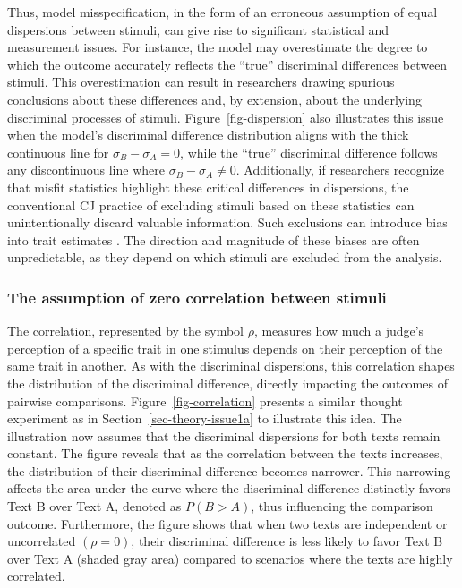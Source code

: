 \documentclass[
  authoryear,
  review,
  1p]{elsarticle}
\begin{document}
Thus, model misspecification, in the form of an erroneous assumption of
equal dispersions between stimuli, can give rise to significant
statistical and measurement issues. For instance, the model may
overestimate the degree to which the outcome accurately reflects the
``true'' discriminal differences between stimuli. This overestimation
can result in researchers drawing spurious conclusions about these
differences \citep[pp.~370]{McElreath_2020} and, by extension, about the
underlying discriminal processes of stimuli. Figure~\ref{fig-dispersion}
also illustrates this issue when the model's discriminal difference
distribution aligns with the thick continuous line for
\(\sigma_{B}-\sigma_{A}=0\), while the ``true'' discriminal difference
follows any discontinuous line where \(\sigma_{B}-\sigma_{A} \neq 0\).
Additionally, if researchers recognize that misfit statistics highlight
these critical differences in dispersions, the conventional CJ practice
of excluding stimuli based on these statistics
\citep{Pollitt_2012a, Pollitt_2012b, vanDaal_et_al_2016, Goossens_et_al_2018}
can unintentionally discard valuable information. Such exclusions can
introduce bias into trait estimates
\citep[chap.~12]{Zimmerman_1994, McElreath_2020}. The direction and
magnitude of these biases are often unpredictable, as they depend on
which stimuli are excluded from the analysis.

\subsubsection{The assumption of zero correlation between
stimuli}\label{sec-theory-issue1b}

The correlation, represented by the symbol \(\rho\), measures how much a
judge's perception of a specific trait in one stimulus depends on their
perception of the same trait in another. As with the discriminal
dispersions, this correlation shapes the distribution of the discriminal
difference, directly impacting the outcomes of pairwise comparisons.
Figure~\ref{fig-correlation} presents a similar thought experiment as in
Section~\ref{sec-theory-issue1a} to illustrate this idea. The
illustration now assumes that the discriminal dispersions for both texts
remain constant. The figure reveals that as the correlation between the
texts increases, the distribution of their discriminal difference
becomes narrower. This narrowing affects the area under the curve where
the discriminal difference distinctly favors Text B over Text A, denoted
as \(P(B > A)\), thus influencing the comparison outcome. Furthermore,
the figure shows that when two texts are independent or uncorrelated
\((\rho=0)\), their discriminal difference is less likely to favor Text
B over Text A (shaded gray area) compared to scenarios where the texts
are highly correlated.
\end{document}
